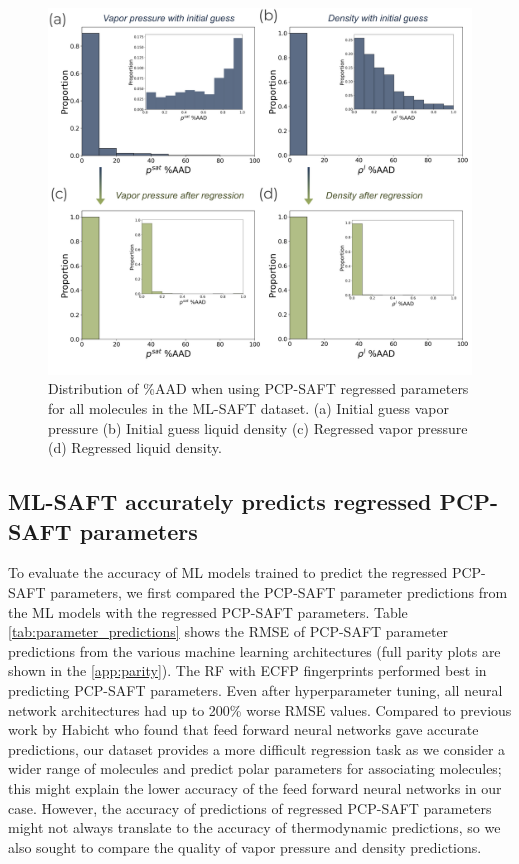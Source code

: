\begin{figure}
    \centering
    \includegraphics[width=\textwidth]{gfx/Chapter08/regression_errors.png}
    \caption{Distribution of \%AAD  when using PCP-SAFT regressed parameters for all molecules in the ML-SAFT dataset. (a) Initial guess vapor pressure (b) Initial guess liquid density (c) Regressed vapor pressure (d) Regressed liquid density.}
    \label{fig:regression_errors}
\end{figure}

\subsection{ML-SAFT accurately predicts regressed PCP-SAFT parameters}

To evaluate the accuracy of ML models trained to predict the regressed PCP-SAFT parameters, we first compared the PCP-SAFT parameter predictions from the ML models with the regressed PCP-SAFT parameters. Table \ref{tab:parameter_predictions} shows the RMSE of PCP-SAFT parameter predictions from the various machine learning architectures (full parity plots are shown in the \ref{app:parity}). The RF with ECFP fingerprints performed best in predicting PCP-SAFT parameters. Even after hyperparameter tuning, all neural network architectures had up to 200\% worse RMSE values. Compared to previous work by Habicht who found that feed forward neural networks gave accurate predictions, our dataset provides a more difficult regression task as we consider a wider range of molecules and predict polar parameters for associating molecules; this might explain the lower accuracy of the feed forward neural networks in our case. However, the accuracy of predictions of regressed PCP-SAFT parameters might not always translate to the accuracy of thermodynamic predictions, so we also sought to compare the quality of vapor pressure and density predictions.


